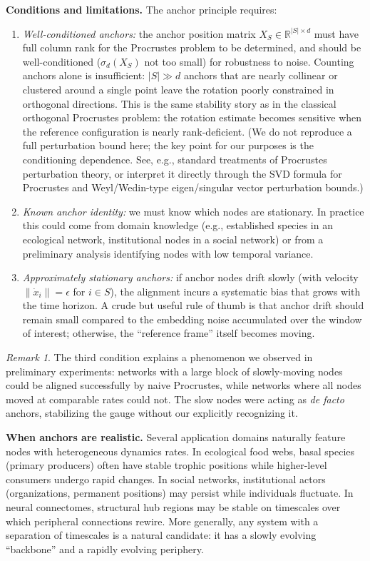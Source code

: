 \documentclass{article}
\newcommand{\RR}{\mathbb{R}}
\theoremstyle{plain}
\theoremstyle{definition}
\theoremstyle{remark}
\newtheorem*{remark}{Remark}
\begin{document}
\textbf{Conditions and limitations.}
The anchor principle requires:
\begin{enumerate}
\item \emph{Well-conditioned anchors:} the anchor position matrix $X_S \in \RR^{|S| \times d}$ must have full column rank for the Procrustes problem to be determined, and should be well-conditioned ($\sigma_d(X_S)$ not too small) for robustness to noise. Counting anchors alone is insufficient: $|S| \gg d$ anchors that are nearly collinear or clustered around a single point leave the rotation poorly constrained in orthogonal directions. This is the same stability story as in the classical orthogonal Procrustes problem: the rotation estimate becomes sensitive when the reference configuration is nearly rank-deficient. (We do not reproduce a full perturbation bound here; the key point for our purposes is the conditioning dependence. See, e.g., standard treatments of Procrustes perturbation theory, or interpret it directly through the SVD formula for Procrustes and Weyl/Wedin-type eigen/singular vector perturbation bounds.)
\item \emph{Known anchor identity:} we must know which nodes are stationary. In practice this could come from domain knowledge (e.g., established species in an ecological network, institutional nodes in a social network) or from a preliminary analysis identifying nodes with low temporal variance.
\item \emph{Approximately stationary anchors:} if anchor nodes drift slowly (with velocity $\|\dot{x}_i\| = \epsilon$ for $i \in S$), the alignment incurs a systematic bias that grows with the time horizon. A crude but useful rule of thumb is that anchor drift should remain small compared to the embedding noise accumulated over the window of interest; otherwise, the ``reference frame'' itself becomes moving.
\end{enumerate}

\begin{remark}
The third condition explains a phenomenon we observed in preliminary experiments: networks with a large block of slowly-moving nodes could be aligned successfully by naive Procrustes, while networks where all nodes moved at comparable rates could not.
The slow nodes were acting as \emph{de facto} anchors, stabilizing the gauge without our explicitly recognizing it.
\end{remark}

\textbf{When anchors are realistic.}
Several application domains naturally feature nodes with heterogeneous dynamics rates.
In ecological food webs, basal species (primary producers) often have stable trophic positions while higher-level consumers undergo rapid changes.
In social networks, institutional actors (organizations, permanent positions) may persist while individuals fluctuate.
In neural connectomes, structural hub regions may be stable on timescales over which peripheral connections rewire.
More generally, any system with a separation of timescales is a natural candidate: it has a slowly evolving ``backbone'' and a rapidly evolving periphery.
\end{document}
